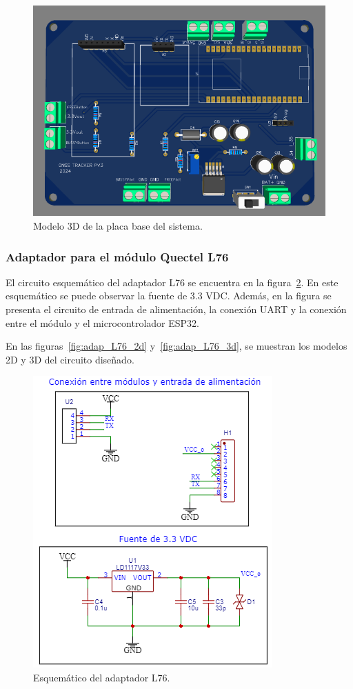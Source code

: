 \begin{figure}[htbp]
	\centering
	\includegraphics[width=.5\textwidth]{./Figures/PCB_TFE_Modelo_3D.png}
	\caption{Modelo 3D de la placa base del sistema.}
	\label{fig:placa_base_3d}
\end{figure}


\subsubsection{Adaptador para el módulo Quectel L76}

El circuito esquemático del adaptador L76 se encuentra en la figura~\ref{fig:adap_L76}. En este esquemático se puede observar la fuente de 3.3 VDC. Además, en la figura se presenta el circuito de entrada de alimentación, la conexión UART y la conexión entre el módulo y el microcontrolador ESP32.  

En las figuras~\ref{fig:adap_L76_2d} y~\ref{fig:adap_L76_3d}, se muestran los modelos 2D y 3D del circuito diseñado. 

\begin{figure}[htbp]
	\centering
	\includegraphics[width=.6\textwidth]{./Figures/QL76_Esquematico.png}
	\caption{Esquemático del adaptador L76.}
	\label{fig:adap_L76}
\end{figure}

